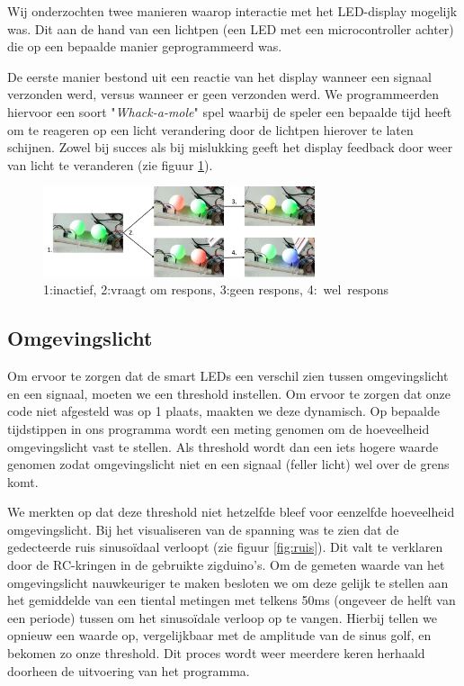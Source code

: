 \documentclass{article}
\begin{document}
Wij onderzochten twee manieren waarop interactie met het LED-display mogelijk was. Dit aan de hand van een lichtpen (een LED met een microcontroller achter) die op een bepaalde manier geprogrammeerd was.

De eerste manier bestond uit een reactie van het display wanneer een signaal verzonden werd, versus wanneer er geen verzonden werd. We programmeerden hiervoor een soort "\textit{Whack-a-mole}" spel waarbij de speler een bepaalde tijd heeft om te reageren op een licht verandering door de lichtpen hierover te laten schijnen. Zowel bij succes als bij mislukking geeft het display feedback door weer van licht te veranderen (zie figuur \ref{fig:mole}).
\begin{figure}
\centering
\includegraphics[width=8cm]{moleSequence.png}
\caption{1:inactief, 2:vraagt om respons, 3:geen respons, \mbox{4: wel respons}}
\label{fig:mole}
\end{figure}

\subsection{Omgevingslicht}
Om ervoor te zorgen dat de smart LEDs een verschil zien tussen omgevingslicht en een signaal, moeten we een threshold instellen. Om ervoor te zorgen dat onze code niet afgesteld was op 1 plaats, maakten we deze dynamisch. Op bepaalde tijdstippen in ons programma wordt een meting genomen om de hoeveelheid omgevingslicht vast te stellen. Als threshold wordt dan een iets hogere waarde genomen zodat omgevingslicht niet en een signaal (feller licht) wel over de grens komt.

We merkten op dat deze threshold niet hetzelfde bleef voor eenzelfde hoeveelheid omgevingslicht. Bij het visualiseren van de spanning was te zien dat de gedecteerde ruis sinusoïdaal verloopt (zie figuur \ref{fig:ruis}). Dit valt te verklaren door de RC-kringen in de gebruikte zigduino's. Om de gemeten waarde van het omgevingslicht nauwkeuriger te maken besloten we om deze gelijk te stellen aan het gemiddelde van een tiental metingen met telkens 50ms (ongeveer de helft van een periode) tussen om het sinusoïdale verloop op te vangen. Hierbij tellen we opnieuw een waarde op, vergelijkbaar met de amplitude van de sinus golf, en bekomen zo onze threshold. Dit proces wordt weer meerdere keren herhaald doorheen de uitvoering van het programma.
\end{document}

